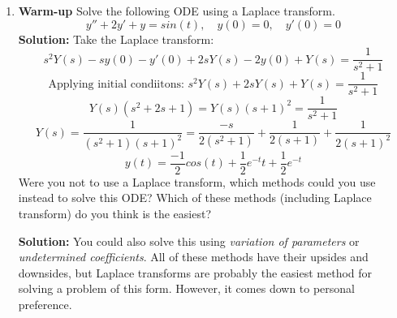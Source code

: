 \documentclass[letterpaper, fontsize=11pt]{scrartcl} %
\numberwithin{equation}{section} %
\numberwithin{figure}{section} %
\numberwithin{table}{section} %
\begin{document}
\begin{enumerate}
\item \textbf{Warm-up} Solve the following ODE using a Laplace transform. \newline
$$y'' + 2y' + y = sin(t), \quad y(0) = 0, \quad y'(0) = 0$$
\textbf{Solution:} Take the Laplace transform:
$$s^2Y(s) - sy(0) - y'(0) + 2sY(s) - 2y(0) + Y(s) = \frac{1}{s^2 + 1}$$
$$\text{Applying initial condiitons: } s^2Y(s) + 2sY(s) + Y(s) = \frac{1}{s^2 + 1}$$
$$Y(s)(s^2 + 2s + 1) = Y(s)(s+1)^2 = \frac{1}{s^2 + 1} $$
$$Y(s) = \frac{1}{(s^2 + 1)(s+1)^2} = \frac{-s}{2(s^2 + 1)} + \frac{1}{2(s+1)} + \frac{1}{2(s+1)^2}$$
$$y(t) = \frac{-1}{2}cos(t) + \frac{1}{2}e^{-t}t + \frac{1}{2}e^{-t}$$
Were you not to use a Laplace transform, which methods could you use instead to solve this ODE? Which of these methods (including Laplace transform) do you think is the easiest? \par
\textbf{Solution:} You could also solve this  using \textit{variation of parameters} or \textit{undetermined coefficients}. All of these methods have their upsides and downsides, but Laplace transforms are probably the easiest method for solving a problem of this form. However, it comes down to personal preference.


\end{enumerate}
\end{document}
